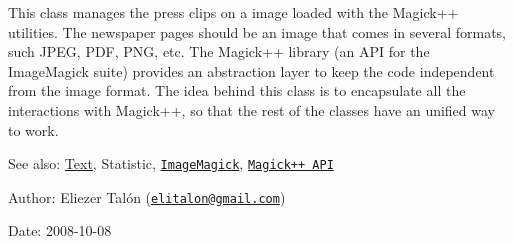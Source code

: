 This class manages the press clips on a image loaded with the Magick++ utilities. The newspaper pages should be an image that comes in several formats, such JPEG, PDF, PNG, etc. The Magick++ library (an API for the ImageMagick suite) provides an abstraction layer to keep the code independent from the image format. The idea behind this class is to encapsulate all the interactions with Magick++, so that the rest of the classes have an unified way to work.

\begin{Desc}
\item[See also:]\hyperlink{class_text}{Text}, Statistic, \href{http://www.imagemagick.org}{\tt ImageMagick}, \href{http://www.imagemagick.org/Magick++/}{\tt Magick++ API}\end{Desc}
\begin{Desc}
\item[Author:]Eliezer Talón (\href{mailto:elitalon@gmail.com}{\tt elitalon@gmail.com}) \end{Desc}
\begin{Desc}
\item[Date:]2008-10-08 \end{Desc}


